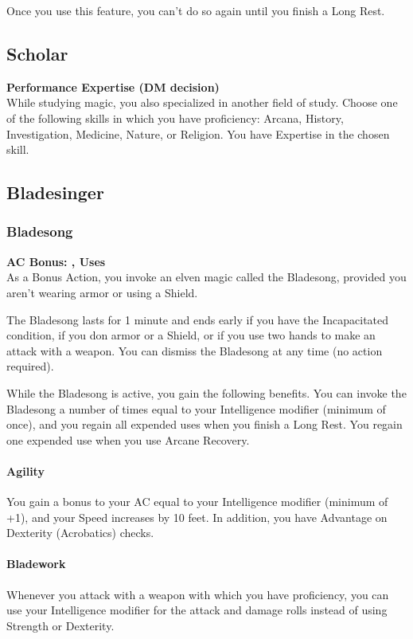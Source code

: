 \documentclass[letterpaper,openany,oneside,twocolumn]{book}
\begin{document}
Once you use this feature, you can't do so again until you finish a Long Rest.
\subsection*{Scholar}
\textbf{Performance Expertise (DM decision)}\\
While studying magic, you also specialized in another field of study. Choose one of the following skills in which you have proficiency: Arcana, History, Investigation, Medicine, Nature, or Religion. You have Expertise in the chosen skill.
\subsection*{Bladesinger}
\subsubsection*{Bladesong}
\textbf{AC Bonus: \calculateModifier{\IntelligenceScoreValue},  Uses}\\
As a Bonus Action, you invoke an elven magic called the Bladesong, provided you aren't wearing armor or using a Shield.

The Bladesong lasts for 1 minute and ends early if you have the Incapacitated condition, if you don armor or a Shield, or if you use two hands to make an attack with a weapon. You can dismiss the Bladesong at any time (no action required).

While the Bladesong is active, you gain the following benefits. You can invoke the Bladesong a number of times equal to your Intelligence modifier (minimum of once), and you regain all expended uses when you finish a Long Rest. You regain one expended use when you use Arcane Recovery.

\paragraph*{Agility} You gain a bonus to your AC equal to your Intelligence modifier (minimum of +1), and your Speed increases by 10 feet. In addition, you have Advantage on Dexterity (Acrobatics) checks.

\paragraph*{Bladework} Whenever you attack with a weapon with which you have proficiency, you can use your Intelligence modifier for the attack and damage rolls instead of using Strength or Dexterity.
\end{document}
